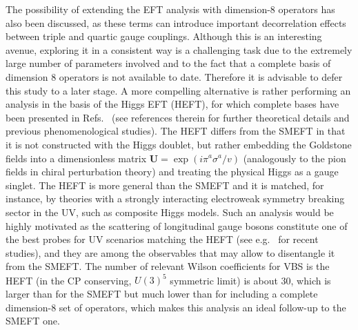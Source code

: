 The possibility of extending the EFT analysis with dimension-8 operators has also been discussed, as these terms can introduce important decorrelation effects between triple and quartic gauge couplings. Although this is an interesting avenue, exploring it in a consistent way is a challenging task due to the extremely large number of parameters involved and to the fact that a complete basis of dimension 8 operators is not available to date. Therefore it is advisable to defer this study to a later stage. A more compelling alternative is rather performing an analysis in the basis of the Higgs EFT (HEFT), for which complete bases have been presented in Refs.~\cite{Buchalla:2013rka,Brivio:2016fzo} (see references therein for further theoretical details and previous phenomenological studies). The HEFT differs from the SMEFT in that it is not constructed with the Higgs doublet, but rather embedding the Goldstone fields into a dimensionless matrix $\mathbf{U}=\exp(i\pi^a\sigma^a/v)$ (analogously to the pion fields in chiral perturbation theory) and treating the physical Higgs as a gauge singlet. The HEFT is more general than the SMEFT and it is matched, for instance, by theories with a strongly interacting electroweak symmetry breaking sector in the UV, such as composite Higgs models. Such an analysis would be highly motivated as the scattering of longitudinal gauge bosons constitute one of the best probes for UV scenarios matching the HEFT (see e.g.~\cite{Delgado:2013hxa,Delgado:2014jda} for recent studies), and they are among the observables that may allow to disentangle it from the SMEFT. The number of relevant Wilson coefficients for VBS is the HEFT (in the CP conserving, $U(3)^5$ symmetric limit) is about 30, which is larger than for the SMEFT but much lower than for including a complete dimension-8 set of operators, which makes this analysis an ideal follow-up to the SMEFT one.

